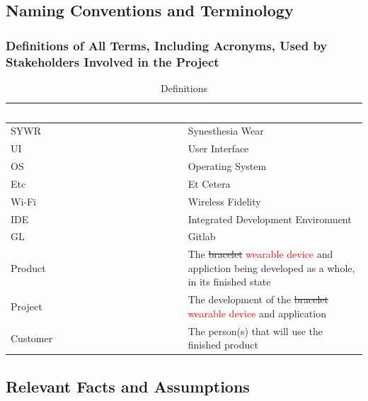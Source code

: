 \documentclass[12pt]{article}
\begin{document}
\subsection{Naming Conventions and Terminology}
\subsubsection{Definitions of All Terms, Including Acronyms, Used by Stakeholders Involved in the Project }
\begin{table} [H]
  \centering
  \begin{tabular}{|>{\centering\arraybackslash}p{7cm}|>{\centering\arraybackslash}p{8cm}} 
  \hline
  \rowcolor[rgb]{0.071,0.49,0.698} \textcolor{white}{ACRONYNM/ABBREVIATION} & \textcolor{white}{INTENDED MEANING}\\ 
  \hline
  \rowcolor[rgb]{0.675,0.827,0.902} SYWR & Synesthesia Wear\\ 
  \hline
  \rowcolor[rgb]{0.675,0.827,0.902} UI & User Interface\\ 
  \hline
  \rowcolor[rgb]{0.675,0.827,0.902} OS & Operating System\\ 
  \hline
  \rowcolor[rgb]{0.675,0.827,0.902} Etc & Et Cetera\\ 
  \hline
  \rowcolor[rgb]{0.675,0.827,0.902} Wi-Fi & Wireless Fidelity\\ 
  \hline
  \rowcolor[rgb]{0.675,0.827,0.902} IDE & Integrated Development Environment\\ 
  \hline
  \rowcolor[rgb]{0.675,0.827,0.902} GL & Gitlab\\ 
  \hline
  \rowcolor[rgb]{0.675,0.827,0.902} Product & The \sout{bracelet} \textcolor{red}{wearable device} and appliction being developed as a whole, in its finished state\\ 
  \hline
  \rowcolor[rgb]{0.675,0.827,0.902} Project & The development of the \sout{bracelet} \textcolor{red}{wearable device} and application\\ 
  \hline
  \rowcolor[rgb]{0.675,0.827,0.902} Customer & The person(s) that will use the finished product\\ 
  \hline
  \end{tabular}
  \label{Definitions}
  \caption{Definitions}
\end{table}

\subsection{Relevant Facts and Assumptions}
\end{document}
